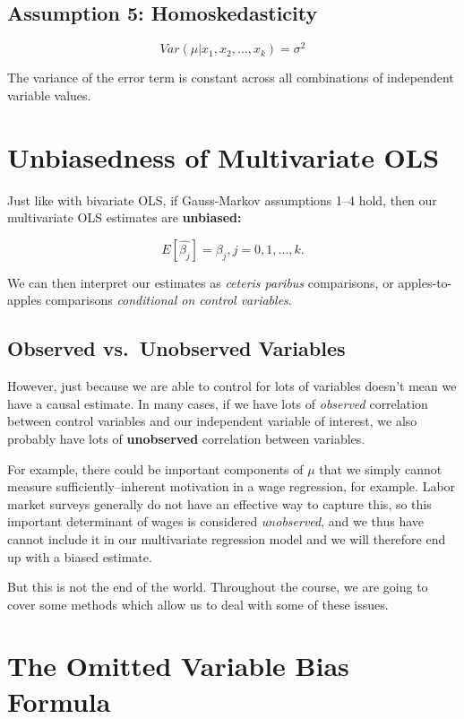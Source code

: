 \documentclass[
  letterpaper,
  DIV=11,
  numbers=noendperiod]{scrreprt}
\begin{document}
\subsection{Assumption 5:
Homoskedasticity}\label{assumption-5-homoskedasticity-1}

\[
Var(\mu | x_1, x_2, \ldots, x_k) = \sigma^2
\]

The variance of the error term is constant across all combinations of
independent variable values.

\section{Unbiasedness of Multivariate
OLS}\label{unbiasedness-of-multivariate-ols}

Just like with bivariate OLS, if Gauss-Markov assumptions 1--4 hold,
then our multivariate OLS estimates are \textbf{unbiased:}

\[
E[\hat{\beta_j}] = \beta_j, j = {0, 1, ..., k}.
\]

We can then interpret our estimates as \emph{ceteris paribus}
comparisons, or apples-to-apples comparisons \emph{conditional on
control variables}.

\subsection{Observed vs.~Unobserved
Variables}\label{observed-vs.-unobserved-variables}

However, just because we are able to control for lots of variables
doesn't mean we have a causal estimate. In many cases, if we have lots
of \emph{observed} correlation between control variables and our
independent variable of interest, we also probably have lots of
\textbf{unobserved} correlation between variables.

For example, there could be important components of \(\mu\) that we
simply cannot measure sufficiently--inherent motivation in a wage
regression, for example. Labor market surveys generally do not have an
effective way to capture this, so this important determinant of wages is
considered \emph{unobserved}, and we thus have cannot include it in our
multivariate regression model and we will therefore end up with a biased
estimate.

But this is not the end of the world. Throughout the course, we are
going to cover some methods which allow us to deal with some of these
issues.

\section{The Omitted Variable Bias
Formula}\label{the-omitted-variable-bias-formula}
\end{document}
